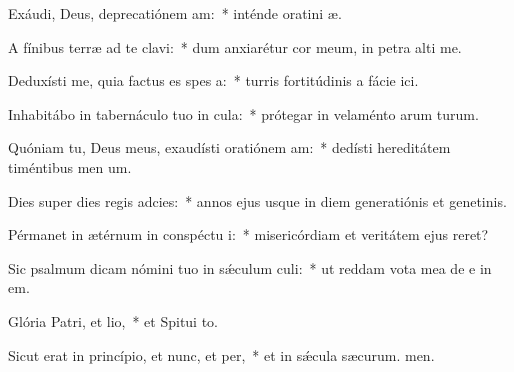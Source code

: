 \item Exáudi, Deus, deprecatiónem am:~* inténde oratini æ.
\item A fínibus terræ ad te clavi:~* dum anxiarétur cor meum, in petra alti me.
\item Deduxísti me, quia factus es spes a:~* turris fortitúdinis a fácie ici.
\item Inhabitábo in tabernáculo tuo in cula:~* prótegar in velaménto arum turum.
\item Quóniam tu, Deus meus, exaudísti oratiónem am:~* dedísti hereditátem timéntibus men um.
\item Dies super dies regis adcies:~* annos ejus usque in diem generatiónis et genetinis.
\item Pérmanet in ætérnum in conspéctu i:~* misericórdiam et veritátem ejus  reret?
\item Sic psalmum dicam nómini tuo in sǽculum culi:~* ut reddam vota mea de e in em.
\item Glória Patri, et lio,~* et Spitui to.
\item Sicut erat in princípio, et nunc, et per,~* et in sǽcula sæcurum. men.
